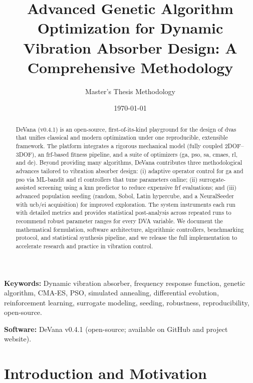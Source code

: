 \documentclass[12pt,a4paper]{article}
\title{Advanced Genetic Algorithm Optimization for Dynamic Vibration Absorber Design: A Comprehensive Methodology}
\author{Master's Thesis Methodology}
\date{\today}
\newcommand{\softwareName}{DeVana}
\newcommand{\softwareVersion}{v0.4.1}
\begin{document}
\maketitle

\begin{abstract}
\softwareName{} (\softwareVersion{}) is an open-source, first-of-its-kind playground for the design of \glspl{dva} that unifies classical and modern optimization under one reproducible, extensible framework. The platform integrates a rigorous mechanical model (fully coupled 2DOF--3DOF), an \gls{frf}-based fitness pipeline, and a suite of optimizers (\gls{ga}, \gls{pso}, \gls{sa}, \gls{cmaes}, \gls{rl}, and \gls{de}). Beyond providing many algorithms, \softwareName{} contributes three methodological advances tailored to vibration absorber design: (i) adaptive operator control for \gls{ga} and \gls{pso} via ML-bandit and \gls{rl} controllers that tune parameters online; (ii) surrogate-assisted screening using a \gls{knn} predictor to reduce expensive \gls{frf} evaluations; and (iii) advanced population seeding (random, Sobol, Latin hypercube, and a NeuralSeeder with \gls{ucb}/\gls{ei} acquisition) for improved exploration. The system instruments each run with detailed metrics and provides statistical post-analysis across repeated runs to recommend robust parameter ranges for every DVA variable. We document the mathematical formulation, software architecture, algorithmic controllers, benchmarking protocol, and statistical synthesis pipeline, and we release the full implementation to accelerate research and practice in vibration control.
\end{abstract}

\noindent\textbf{Keywords:} Dynamic vibration absorber, frequency response function, genetic algorithm, CMA-ES, PSO, simulated annealing, differential evolution, reinforcement learning, surrogate modeling, seeding, robustness, reproducibility, open-source.

\vspace{0.5em}
\noindent\textbf{Software:} \softwareName{} \softwareVersion{} (open-source; available on GitHub and project website).

\tableofcontents
\newpage

\printglossary[type=\acronymtype,title=List of Acronyms]
\newpage

\section{Introduction and Motivation}
\end{document}
